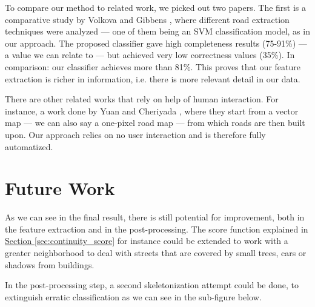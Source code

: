 \documentclass[10pt,conference,compsocconf]{IEEEtran}
\newcommand{\secref}[1]{\hyperref[#1]{Section \ref*{#1}}}
\begin{document}
To compare our method to related work, we picked out two papers. The first is a comparative study by Volkova and Gibbens \cite{VoGi15}, where different road extraction techniques were analyzed --- one of them being an SVM classification model, as in our approach. The proposed classifier gave high completeness results (75-91\%) --- a value we can relate to --- but achieved very low correctness values (35\%). In comparison: our classifier achieves more than 81\%. This proves that our feature extraction is richer in information, i.e. there is more relevant detail in our data.

There are other related works that rely on help of human interaction. For instance, a work done by Yuan and Cheriyada \cite{YuCh13}, where they start from a vector map --- we can also say a one-pixel road map --- from which roads are then built upon. Our approach relies on no user interaction and is therefore fully automatized.

\section{Future Work}
\label{sec:future_work}

As we can see in the final result, there is still potential for improvement, both in the feature extraction and in the post-processing. The score function explained in \secref{sec:continuity_score} for instance could be extended to work with a greater neighborhood to deal with streets that are covered by small trees, cars or shadows from buildings.

In the post-processing step, a second skeletonization attempt could be done, to extinguish erratic classification as we can see in the sub-figure  below.
\end{document}
